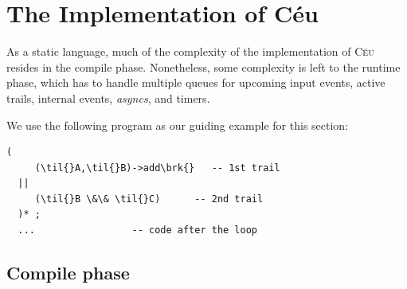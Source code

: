 \documentclass{sig-alternate-ipsn09}
\newcommand{\2}{\;\;}
\newcommand{\5}{\;\;\;\;\;}
\newcommand{\til}{$\thicksim$}
\newcommand{\brk}{\textbf{\small{$^\wedge$}}}
\newcommand{\CEU}{\textsc{C\'{e}u}}
\begin{document}

\section{The Implementation of C\'eu}
\label{sec:impl}

As a static language, much of the complexity of the implementation of \CEU{} 
resides in the compile phase.
Nonetheless, some complexity is left to the runtime phase, which has to handle 
multiple queues for upcoming input events, active trails, internal events, 
\emph{asyncs}, and timers.

We use the following program as our guiding example for this section:

\begin{Verbatim}[commandchars=\\\{\}]
  (
     (\til{}A,\til{}B)->add\brk{}   -- 1st trail
  ||
     (\til{}B \&\& \til{}C)      -- 2nd trail
  )* ;
  ...                 -- code after the loop
\end{Verbatim}

\subsection{Compile phase}
\end{document}
